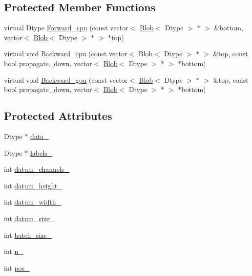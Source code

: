 \subsection*{Protected Member Functions}
\begin{DoxyCompactItemize}
\item 
virtual Dtype \hyperlink{classcaffe_1_1_memory_data_layer_a124ae7ed94f0cad8a7c64b3c4b79eb33}{Forward\+\_\+cpu} (const vector$<$ \hyperlink{classcaffe_1_1_blob}{Blob}$<$ Dtype $>$ $\ast$ $>$ \&bottom, vector$<$ \hyperlink{classcaffe_1_1_blob}{Blob}$<$ Dtype $>$ $\ast$ $>$ $\ast$top)
\item 
virtual void \hyperlink{classcaffe_1_1_memory_data_layer_ac85916554558f0ca7881bd3ee608865c}{Backward\+\_\+cpu} (const vector$<$ \hyperlink{classcaffe_1_1_blob}{Blob}$<$ Dtype $>$ $\ast$ $>$ \&top, const bool propagate\+\_\+down, vector$<$ \hyperlink{classcaffe_1_1_blob}{Blob}$<$ Dtype $>$ $\ast$ $>$ $\ast$bottom)
\item 
virtual void \hyperlink{classcaffe_1_1_memory_data_layer_ab209891a982c0962c78c36dedf2916ed}{Backward\+\_\+gpu} (const vector$<$ \hyperlink{classcaffe_1_1_blob}{Blob}$<$ Dtype $>$ $\ast$ $>$ \&top, const bool propagate\+\_\+down, vector$<$ \hyperlink{classcaffe_1_1_blob}{Blob}$<$ Dtype $>$ $\ast$ $>$ $\ast$bottom)
\end{DoxyCompactItemize}
\subsection*{Protected Attributes}
\begin{DoxyCompactItemize}
\item 
Dtype $\ast$ \hyperlink{classcaffe_1_1_memory_data_layer_a57a7e3dca84db2b07cb009a44c6ae45c}{data\+\_\+}
\item 
Dtype $\ast$ \hyperlink{classcaffe_1_1_memory_data_layer_abf7f9a81ae3268a6eea7fbd97760e28a}{labels\+\_\+}
\item 
int \hyperlink{classcaffe_1_1_memory_data_layer_ae77bcb4c0f6183477f264438c90fe6b6}{datum\+\_\+channels\+\_\+}
\item 
int \hyperlink{classcaffe_1_1_memory_data_layer_a7a72970c6c500580c0b889dbb492aa9e}{datum\+\_\+height\+\_\+}
\item 
int \hyperlink{classcaffe_1_1_memory_data_layer_ac11837cf9ad597efdae80110c328df80}{datum\+\_\+width\+\_\+}
\item 
int \hyperlink{classcaffe_1_1_memory_data_layer_ae402a79948a2f545139c45c0d48fd45a}{datum\+\_\+size\+\_\+}
\item 
int \hyperlink{classcaffe_1_1_memory_data_layer_a94335b05660c950a4ba711342daff276}{batch\+\_\+size\+\_\+}
\item 
int \hyperlink{classcaffe_1_1_memory_data_layer_a303b19a435878a94ede0c8e1fb26f2a1}{n\+\_\+}
\item 
int \hyperlink{classcaffe_1_1_memory_data_layer_a21694a78bc84c9cedae58e66ee542a5b}{pos\+\_\+}
\end{DoxyCompactItemize}


